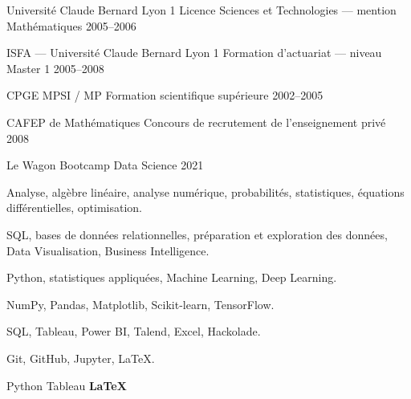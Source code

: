 \documentclass[10.5pt,a4paper]{article}
\begin{document}


\cventry
    {Université Claude Bernard Lyon 1}
    {Licence Sciences et Technologies --- mention Mathématiques}
    {2005--2006}

\cventry
    {ISFA --- Université Claude Bernard Lyon 1}
    {Formation d'actuariat --- niveau Master 1}
    {2005--2008}

\cventry
    {CPGE MPSI / MP}
    {Formation scientifique supérieure}
    {2002--2005}

\cventry
    {CAFEP de Mathématiques}
    {Concours de recrutement de l'enseignement privé}
    {2008}

\cventry
    {Le Wagon}
    {Bootcamp Data Science}
    {2021}



{Analyse, algèbre linéaire, analyse numérique, probabilités, statistiques,
équations différentielles, optimisation.}

{SQL, bases de données relationnelles, préparation et exploration des données,
Data Visualisation, Business Intelligence.}

{Python, statistiques appliquées, Machine Learning, Deep Learning.}



{NumPy, Pandas, Matplotlib, Scikit-learn, TensorFlow.}

{SQL, Tableau, Power BI, Talend, Excel, Hackolade.}

{Git, GitHub, Jupyter, \LaTeX.}

\vspace{0.35cm}

\begin{center}
{\large
\faPython
\quad\textsf{Python}
\qquad\qquad
\faChartBar
\quad\textsf{Tableau}
\qquad\qquad
\textbf{\LaTeX}
}
\end{center}
\end{document}
